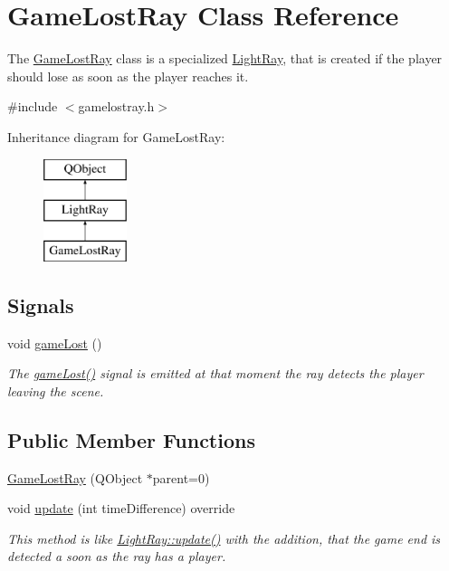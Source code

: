 \hypertarget{class_game_lost_ray}{\section{Game\+Lost\+Ray Class Reference}
\label{class_game_lost_ray}
}


The \hyperlink{class_game_lost_ray}{Game\+Lost\+Ray} class is a specialized \hyperlink{class_light_ray}{Light\+Ray}, that is created if the player should lose as soon as the player reaches it.  




{\ttfamily \#include $<$gamelostray.\+h$>$}

Inheritance diagram for Game\+Lost\+Ray\+:\begin{figure}[H]
\begin{center}
\leavevmode
\includegraphics[height=3.000000cm]{class_game_lost_ray}
\end{center}
\end{figure}
\subsection*{Signals}
\begin{DoxyCompactItemize}
\item 
void \hyperlink{class_game_lost_ray_a9b2afbad70387bd9ec8f80170760ef57}{game\+Lost} ()
\begin{DoxyCompactList}\small\item\em The \hyperlink{class_game_lost_ray_a9b2afbad70387bd9ec8f80170760ef57}{game\+Lost()} signal is emitted at that moment the ray detects the player leaving the scene. \end{DoxyCompactList}\end{DoxyCompactItemize}
\subsection*{Public Member Functions}
\begin{DoxyCompactItemize}
\item 
\hyperlink{class_game_lost_ray_a15ec367ee8dfd87bc8deccde5553f8e6}{Game\+Lost\+Ray} (Q\+Object $\ast$parent=0)
\item 
void \hyperlink{class_game_lost_ray_a417d814372891fe7595a7e745b7a9f0f}{update} (int time\+Difference) override
\begin{DoxyCompactList}\small\item\em This method is like \hyperlink{class_light_ray_acf06a71a307433fa5b220baccf809e64}{Light\+Ray\+::update()} with the addition, that the game end is detected a soon as the ray has a player. \end{DoxyCompactList}\end{DoxyCompactItemize}
